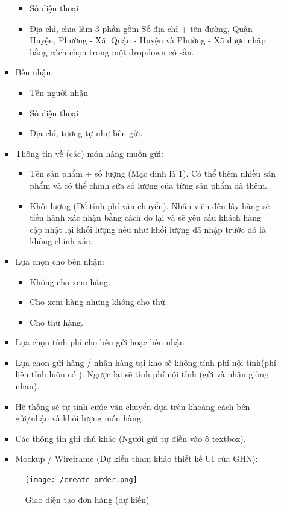 \begin{itemize}
\begin{itemize}
\begin{itemize}
\begin{itemize}
				\item Số điện thoại
				\item Địa chỉ, chia làm 3 phần gồm Số địa chỉ + tên đường, Quận - Huyện, Phường - Xã. Quận - Huyện và Phường - Xã được nhập bằng cách chọn trong một dropdown có sẵn.
			\end{itemize}
			\item Bên nhận:
			\begin{itemize}
				\item Tên người nhận
				\item Số điện thoại
				\item Địa chỉ, tương tự như bên gửi.
			\end{itemize}
			\item Thông tin về (các) món hàng muốn gửi:
			\begin{itemize}
				\item Tên sản phẩm + số lượng (Mặc định là 1). Có thể thêm nhiều sản phẩm và có thể chỉnh sửa số lượng của từng sản phẩm đã thêm.
				\item Khối lượng (Để tính phí vận chuyển). Nhân viên đến lấy hàng sẽ tiến hành xác nhận bằng cách đo lại và sẽ yêu cầu khách hàng cập nhật lại khối lượng nếu như khối lượng đã nhập trước đó là không chính xác.
				
			\end{itemize}
			\item Lựa chọn cho bên nhận:
			\begin{itemize}
				\item Không cho xem hàng.
				\item Cho xem hàng nhưng không cho thử.
				\item Cho thử hàng.
			\end{itemize}
			\item Lựa chọn tính phí cho bên gửi hoặc bên nhận 
			\item Lựa chon gửi hàng / nhận hàng tại kho sẽ không tính phí nội tỉnh(phí liên tỉnh luôn có ). Ngược lại sẽ tính phí nội tỉnh (gửi và nhận giống nhau). 
			\item Hệ thống sẽ tự tính cước vận chuyển dựa trên khoảng cách bên gửi/nhận và khối lượng món hàng.
			\item Các thông tin ghi chú khác (Người gửi tự điền vào ô textbox).
			\item Mockup / Wireframe (Dự kiến tham khảo thiết kế UI của GHN):
		\end{itemize} 
		
		\begin{figure}[!ht]
			\texttt{[image: /create-order.png]}
			\centering
			\linebreak
			\caption{Giao diện tạo đơn hàng (dự kiến)}
		\end{figure}
		

\end{itemize}
\end{itemize}
